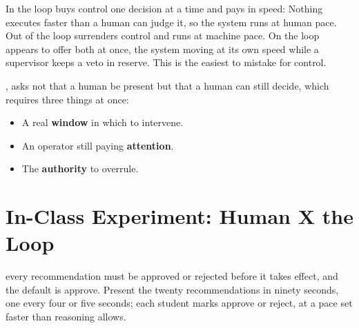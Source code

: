 In the loop
buys control one decision at a time and pays in speed: Nothing executes
faster than a human can judge it, so the system runs at human pace. Out of
the loop surrenders control and runs at machine pace. On the loop appears
to offer both at once, the system moving at its own speed while a
supervisor keeps a veto in reserve. This is the easiest to mistake for
control.




, asks not that a human be present but that a human can still decide, which
requires three things at once:

\begin{itemize}
    \item A real \textbf{window} in which to intervene.
    \item An operator still paying \textbf{attention}.
    \item The \textbf{authority} to overrule.
\end{itemize}







\section*{In-Class Experiment: Human X the Loop}



 every recommendation
must be approved or rejected before it takes effect, and the default is
approve. Present the twenty recommendations in ninety seconds, one every four
or five seconds; each student marks approve or reject, at a pace set faster
than reasoning allows.

